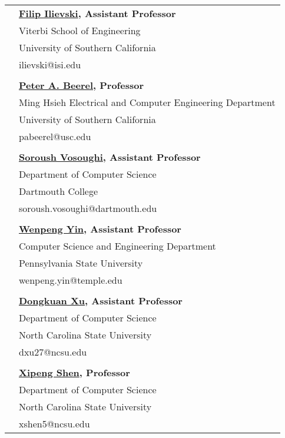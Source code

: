 \documentclass[letterpaper, 10pt]{article}
\begin{document}
\begin{longtable}{p{1.3in}p{4.8in}}
{\color{black}{References}} 
& \textbf{\href{https://usc-isi-i2.github.io/ilievski/}{Filip Ilievski}, Assistant Professor}\\
&  Viterbi School of Engineering \\
&  University of Southern California \\
&  ilievski@isi.edu \\
\\
& \textbf{\href{https://sites.usc.edu/eessc/people/}{Peter A. Beerel}, Professor}\\
&  Ming Hsieh Electrical and Computer Engineering Department \\
&  University of Southern California \\
&  pabeerel@usc.edu \\
\\
& \textbf{\href{https://www.cs.dartmouth.edu/~soroush//}{Soroush Vosoughi}, Assistant Professor}\\
&  Department of Computer Science \\
&  Dartmouth College \\
&  soroush.vosoughi@dartmouth.edu \\
\\
& \textbf{\href{https://www.wenpengyin.org/}{Wenpeng Yin}, Assistant Professor}\\
&  Computer Science and Engineering Department \\
&  Pennsylvania State University \\
&  wenpeng.yin@temple.edu \\
\\
& \textbf{\href{http://personal.psu.edu/dux19/}{Dongkuan Xu}, Assistant Professor}\\
&  Department of Computer Science \\
&  North Carolina State University \\
&  dxu27@ncsu.edu \\
\\
& \textbf{\href{https://people.engr.ncsu.edu/xshen5/}{Xipeng Shen}, Professor}\\
&  Department of Computer Science \\
&  North Carolina State University \\
&  xshen5@ncsu.edu \\







\end{longtable}
\end{document}
